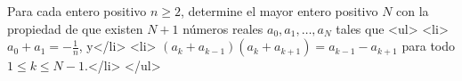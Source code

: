 Para cada entero positivo $n \ge 2$, determine el mayor entero positivo $N$ con la propiedad de que existen $N +1$ números reales $a_0,a_1,\dots,a_N$ tales que
<ul>
<li> $a_0+a_1=-\frac 1n$, y</li>
<li> $(a_k+a_{k-1})(a_k+a_{k+1})=a_{k-1}-a_{k+1}$ para todo $1\leq k \leq N-1$.</li>
</ul>